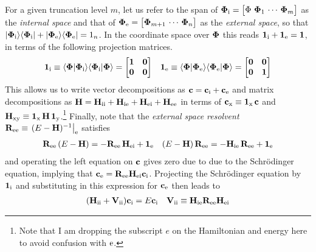 \documentclass[11pt]{article}
\numberwithin{equation}{section}
\begin{document}
\begin{rmk}
\label{rmk:lowdin-partitioning}
For a given truncation level $m$, let us refer to the span of
$\bm{\F}_\mr{i}=\pma{\F\ \bm{\F}_1\,\cd\,\bm{\F}_m}$
as the
\textit{internal space}
and that of
$\bm{\F}_\mr{e}=\pma{\bm{\F}_{m+1}\,\cd\,\bm{\F}_n}$
as the
\textit{external space}, so that
$
  |\mathbf{\Phi }_{\mathrm{i}}\rangle
  \langle\mathbf{\Phi }_{\mathrm{i}}|
+
  |\mathbf{\Phi }_{\mathrm{e}}\rangle
  \langle\mathbf{\Phi }_{\mathrm{e}}|
=
  1_n
$.
In the coordinate space over $\mathbf{\Phi }$ this reads
$
  \mathbf{1}_{\mathrm{i}}
+
  \mathbf{1}_{\mathrm{e}}
=
  \mathbf{1}
$,
in terms of the following projection matrices.
\begin{align}
  \bo{1}_\mr{i}
\equiv
  \ip{\bo{\F}|\bo{\F}_\mr{i}}
  \ip{\bo{\F}_\mr{i}|\bo{\F}}
=
\pma[l]{
  \bo{1} & \bo{0} \\
  \bo{0} & \bo{0}
}
&&
  \bo{1}_\mr{e}
\equiv
  \ip{\bo{\F}|\bo{\F}_\mr{e}}
  \ip{\bo{\F}_\mr{e}|\bo{\F}}
=
\pma[l]{
  \bo{0} & \bo{0} \\
  \bo{0} & \bo{1}
}
\end{align}
This allows us to write vector decompositions as
$
  \mathbf{c}
=
  \mathbf{c}_{\mathrm{i}}
+
  \mathbf{c}_{\mathrm{e}}
$
and matrix decompositions as
$
  \mathbf{H}
=
  \mathbf{H}_{\mathrm{ii}}
+
  \mathbf{H}_{\mathrm{ie}}
+
  \mathbf{H}_{\mathrm{ei}}
+
  \mathbf{H}_{\mathrm{ee}}
$
in terms of
$
  \mathbf{c}_{\mathrm{x}}
\equiv
  \mathbf{1}_{\mathrm{x}}\,
  \mathbf{c}
$
and
$
  \mathbf{H}_{\mathrm{xy}}
\equiv
  \mathbf{1}_{\mathrm{x}}\,
  \mathbf{H}\,
  \mathbf{1}_{\mathrm{y}}
$.\footnote{Note that I am dropping the subscript $e$ on the Hamiltonian and energy here to avoid confusion with $\mathrm{e}$.}
Finally, note that the \textit{external space resolvent}
$
  \mathbf{R}_{\mathrm{ee}}
\equiv
\left.
  (
    E
  -
    \mathbf{H}
  )^{-1}
\right|_{\mathrm{e}}
$
satisfies
\begin{align}
  \mathbf{R}_{\mathrm{ee}}\,
  (
    E
  -
    \mathbf{H}
  )
=
-
  \mathbf{R}_{\mathrm{ee}}\,
  \mathbf{H}_{\mathrm{ei}}
+
  \mathbf{1}_{\mathrm{e}}
&&
  (
    E
  -
    \mathbf{H}
  )\,
  \mathbf{R}_{\mathrm{ee}}
=
-
  \mathbf{H}_{\mathrm{ie}}\,
  \mathbf{R}_{\mathrm{ee}}
+
  \mathbf{1}_{\mathrm{e}}
\end{align}
and operating the left equation on $\mathbf{c}$ gives zero due to due to the Schr\"odinger equation, implying that
$
  \mathbf{c}_{\mathrm{e}}
=
  \mathbf{R}_{\mathrm{ee}}
  \mathbf{H}_{\mathrm{ei}}
  \mathbf{c}_{\mathrm{i}}
$.
Projecting the Schr\"odinger equation by $\mathbf{1}_{\mathrm{i}}$ and substituting in this expression for $\mathbf{c}_{\mathrm{e}}$ then leads to
\begin{align}
  (
    \mathbf{H}_{\mathrm{ii}}
  +
    \mathbf{V}_{\mathrm{ii}}
  )
  \mathbf{c}_{\mathrm{i}}
=
  E
  \mathbf{c}_{\mathrm{i}}
&&
  \mathbf{V}_{\mathrm{ii}}
\equiv
  \mathbf{H}_{\mathrm{ie}}
  \mathbf{R}_{\mathrm{ee}}
  \mathbf{H}_{\mathrm{ei}}
\end{align}

\end{rmk}
\end{document}
